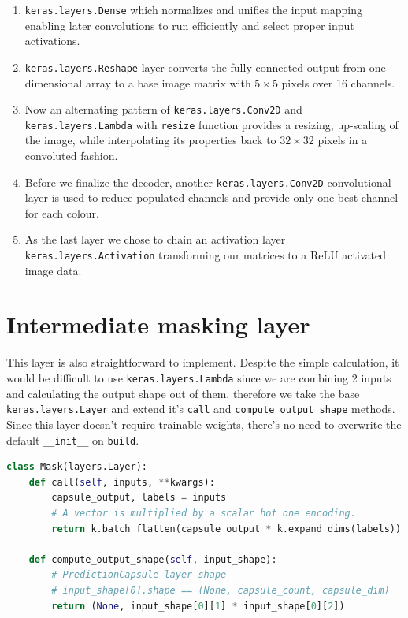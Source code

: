 \begin{enumerate}
    \item \texttt{keras.layers.Dense} which normalizes and unifies the input mapping enabling later convolutions to run efficiently and select proper input activations.
    \item \texttt{keras.layers.Reshape} layer converts the fully connected output from one dimensional array to a base image matrix with $5\times5$ pixels over 16 channels.
    \item Now an alternating pattern of \texttt{keras.layers.Conv2D} and \texttt{keras.layers.Lambda} with \texttt{resize} function provides a resizing, up-scaling of the image, while interpolating its properties back to $32\times32$ pixels in a convoluted fashion.
    \item Before we finalize the decoder, another \texttt{keras.layers.Conv2D} convolutional layer is used to reduce populated channels and provide only one best channel for each colour.
    \item As the last layer we chose to chain an activation layer \texttt{keras.layers.Activation} transforming our matrices to a ReLU activated image data.
\end{enumerate}

\section{Intermediate masking layer}

This layer is also straightforward to implement. Despite the simple calculation, it would be difficult to use \texttt{keras.layers.Lambda} since we are combining 2 inputs and calculating the output shape out of them, therefore we take the base \texttt{keras.layers.Layer} and extend it's \texttt{call} and \texttt{compute\_output\_shape} methods. Since this layer doesn't require trainable weights, there's no need to overwrite the default \texttt{\_\_init\_\_} on \texttt{build}.

\begin{lstlisting}[language=Python, caption=Masking layer.]
class Mask(layers.Layer):
    def call(self, inputs, **kwargs):
        capsule_output, labels = inputs
        # A vector is multiplied by a scalar hot one encoding.
        return k.batch_flatten(capsule_output * k.expand_dims(labels))

    def compute_output_shape(self, input_shape):
        # PredictionCapsule layer shape
        # input_shape[0].shape == (None, capsule_count, capsule_dim)
        return (None, input_shape[0][1] * input_shape[0][2])
\end{lstlisting}


